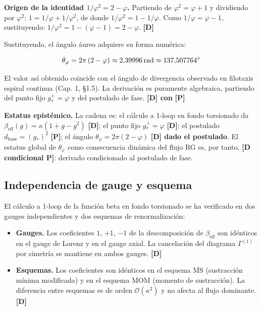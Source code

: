 ﻿\documentclass[11pt,letterpaper]{article}
\begin{document}
\textbf{Origen de la identidad $1/\varphi^2 = 2 - \varphi$.} Partiendo de $\varphi^2 = \varphi + 1$ y dividiendo por $\varphi^2$: $1 = 1/\varphi + 1/\varphi^2$, de donde $1/\varphi^2 = 1 - 1/\varphi$. Como $1/\varphi = \varphi - 1$, sustituyendo: $1/\varphi^2 = 1 - (\varphi - 1) = 2 - \varphi$. \textbf{[D]}

Sustituyendo, el ángulo áureo adquiere su forma numérica:

\begin{equation*}
  \resizebox{\ifdim\width>\linewidth \linewidth\else\width\fi}{!}{$\displaystyle \theta_\varphi = 2\pi\,(2 - \varphi) \approx 2{,}39996\,\text{rad} \approx 137{,}507764^\circ$}
\end{equation*}

El valor así obtenido coincide con el ángulo de divergencia observado en filotaxis espiral continua (Cap. 1, §1.5). La derivación es puramente algebraica, partiendo del punto fijo $g_*^+ = \varphi$ y del postulado de fase. \textbf{[D] con } \textbf{[P]}

\textbf{Estatus epistémico.} La cadena es: el cálculo a 1-loop en fondo torsionado da $\beta_{\text{eff}}(g) = \kappa(1 + g - g^2)$ \textbf{[D]}; el punto fijo $g_*^+ = \varphi$ \textbf{[D]}; el postulado $d_{\text{base}} = (g_*)^2$ \textbf{[P]}; el ángulo $\theta_\varphi = 2\pi(2 - \varphi)$ \textbf{[D] dado el postulado}. El estatus global de $\theta_\varphi$ como consecuencia dinámica del flujo RG es, por tanto, \textbf{[D condicional P]}: derivado condicionado al postulado de fase.
\subsection{Independencia de gauge y esquema}
El cálculo a 1-loop de la función beta en fondo torsionado se ha verificado en dos gauges independientes y dos esquemas de renormalización:

\begin{itemize}[leftmargin=*]
\item \textbf{Gauges.} Los coeficientes $1$, $+1$, $-1$ de la descomposición de $\beta_{\text{eff}}$ son idénticos en el gauge de Lorenz y en el gauge axial. La cancelación del diagrama $\Gamma^{(1)}$ por simetría se mantiene en ambos gauges. \textbf{[D]}
\item \textbf{Esquemas.} Los coeficientes son idénticos en el esquema $\overline{\text{MS}}$ (sustracción mínima modificada) y en el esquema MOM (momento de sustracción). La diferencia entre esquemas es de orden $\mathcal{O}(\kappa^2)$ y no afecta al flujo dominante. \textbf{[D]}
\end{itemize}
\end{document}
